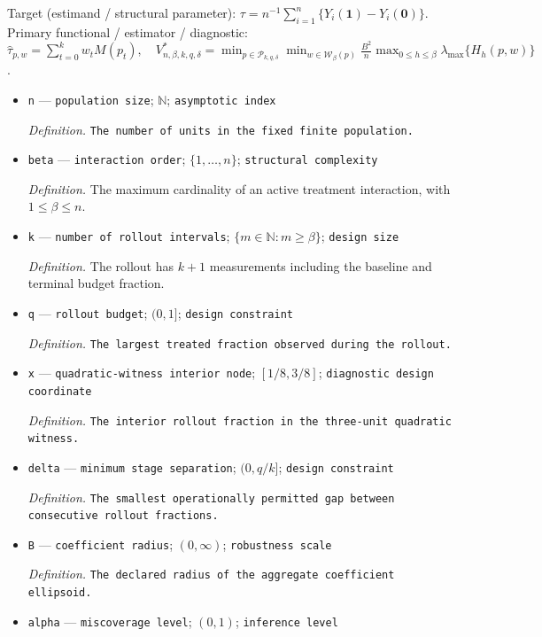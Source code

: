 \documentclass{article}
\begin{document}
Target (estimand / structural parameter): \(\tau=n^{-1}\sum_{i=1}^n\{Y_i(\mathbf 1)-Y_i(\mathbf 0)\}\).
Primary functional / estimator / diagnostic: \(\widehat\tau_{p,w}=\sum_{t=0}^kw_tM(p_t),\quad V^*_{n,\beta,k,q,\delta}=\min_{p\in\mathcal P_{k,q,\delta}}\min_{w\in\mathcal W_\beta(p)}\frac{B^2}{n}\max_{0\le h\le\beta}\lambda_{\max}\{H_h(p,w)\}\).
\begin{itemize}
  \item \texttt{n} --- \texttt{population size}; \(\mathbb N\); \texttt{asymptotic index}
  \par\smallskip\noindent\emph{Definition.} \texttt{The number of units in the fixed finite population.}
  \item \texttt{beta} --- \texttt{interaction order}; \(\{1,\ldots,n\}\); \texttt{structural complexity}
  \par\smallskip\noindent\emph{Definition.} The maximum cardinality of an active treatment interaction, with \(1\le\beta\le n\).
  \item \texttt{k} --- \texttt{number of rollout intervals}; \(\{m\in\mathbb N:m\ge\beta\}\); \texttt{design size}
  \par\smallskip\noindent\emph{Definition.} The rollout has \(k+1\) measurements including the baseline and terminal budget fraction.
  \item \texttt{q} --- \texttt{rollout budget}; \((0,1]\); \texttt{design constraint}
  \par\smallskip\noindent\emph{Definition.} \texttt{The largest treated fraction observed during the rollout.}
  \item \texttt{x} --- \texttt{quadratic-\allowbreak{}witness interior node}; \([1/8,3/8]\); \texttt{diagnostic design coordinate}
  \par\smallskip\noindent\emph{Definition.} \texttt{The interior rollout fraction in the three-\allowbreak{}unit quadratic witness.}
  \item \texttt{delta} --- \texttt{minimum stage separation}; \((0,q/k]\); \texttt{design constraint}
  \par\smallskip\noindent\emph{Definition.} \texttt{The smallest operationally permitted gap between consecutive rollout fractions.}
  \item \texttt{B} --- \texttt{coefficient radius}; \((0,\infty)\); \texttt{robustness scale}
  \par\smallskip\noindent\emph{Definition.} \texttt{The declared radius of the aggregate coefficient ellipsoid.}
  \item \texttt{alpha} --- \texttt{miscoverage level}; \((0,1)\); \texttt{inference level}

\end{itemize}
\end{document}
